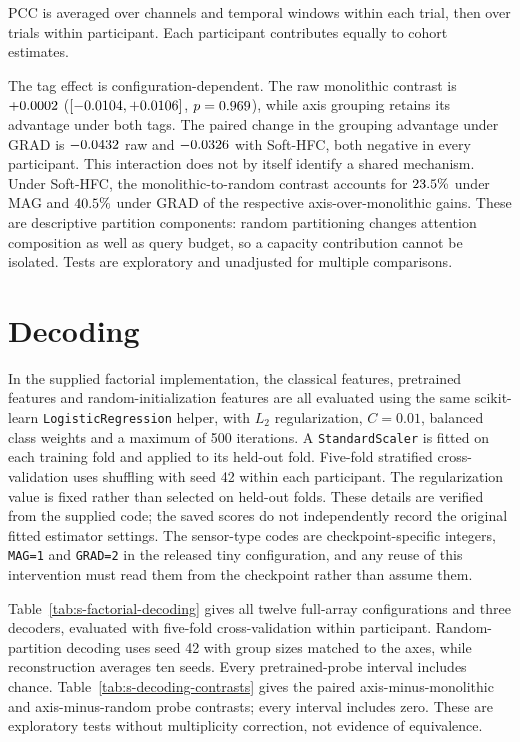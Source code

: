 PCC is averaged over channels and temporal windows within each trial, then over trials within participant. Each participant contributes equally to cohort estimates.

The tag effect is configuration-dependent. The raw monolithic contrast is $+0.0002$ ($[-0.0104, +0.0106]$, $p=0.969$), while axis grouping retains its advantage under both tags. The paired change in the grouping advantage under GRAD is $-0.0432$ raw and $-0.0326$ with Soft-HFC, both negative in every participant. This interaction does not by itself identify a shared mechanism. Under Soft-HFC, the monolithic-to-random contrast accounts for $23.5\%$ under MAG and $40.5\%$ under GRAD of the respective axis-over-monolithic gains. These are descriptive partition components: random partitioning changes attention composition as well as query budget, so a capacity contribution cannot be isolated. Tests are exploratory and unadjusted for multiple comparisons.

\section{Decoding}
In the supplied factorial implementation, the classical features, pretrained features and random-initialization features are all evaluated using the same scikit-learn \texttt{LogisticRegression} helper, with $L_2$ regularization, $C=0.01$, balanced class weights and a maximum of 500 iterations. A \texttt{StandardScaler} is fitted on each training fold and applied to its held-out fold. Five-fold stratified cross-validation uses shuffling with seed 42 within each participant. The regularization value is fixed rather than selected on held-out folds. These details are verified from the supplied code; the saved scores do not independently record the original fitted estimator settings. The sensor-type codes are checkpoint-specific integers, \texttt{MAG=1} and \texttt{GRAD=2} in the released tiny configuration, and any reuse of this intervention must read them from the checkpoint rather than assume them.


Table~\ref{tab:s-factorial-decoding} gives all twelve full-array configurations and three decoders, evaluated with five-fold cross-validation within participant. Random-partition decoding uses seed 42 with group sizes matched to the axes, while reconstruction averages ten seeds. Every pretrained-probe interval includes chance. Table~\ref{tab:s-decoding-contrasts} gives the paired axis-minus-monolithic and axis-minus-random probe contrasts; every interval includes zero. These are exploratory tests without multiplicity correction, not evidence of equivalence.

